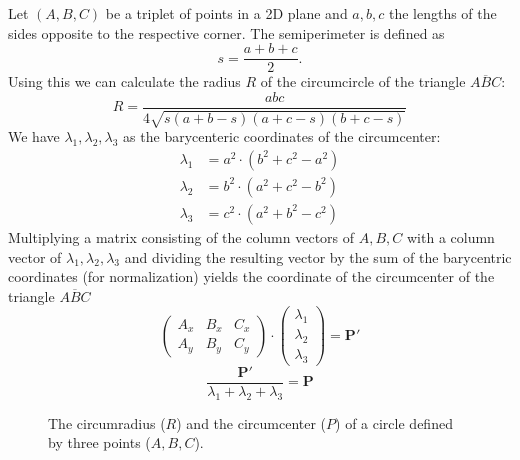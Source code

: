 \documentclass[11pt,twoside]{scrreprt}
\begin{document}
Let $(A,B,C)$ be a triplet of points in a 2D plane and $a,b,c$ the lengths of the sides opposite to the respective corner.
%
The semiperimeter is defined as
%
\begin{equation}
  s = \frac{a+b+c}{2}.
\end{equation}
%
Using this we can calculate the radius $R$ of the circumcircle of the triangle $\overline{ABC}$:
\begin{equation}
  R = \frac{abc}{4\sqrt{s(a+b-s)(a+c-s)(b+c-s)}}
\end{equation}
We have $\lambda_1, \lambda_2, \lambda_3$ as the barycenteric coordinates of the circumcenter:
\begin{align}
  \lambda_1 &= a^2\cdot(b^2+c^2-a^2)\\
  \lambda_2 &= b^2\cdot(a^2+c^2-b^2)\\
  \lambda_3 &= c^2\cdot(a^2+b^2-c^2)
\end{align}
Multiplying a matrix consisting of the column vectors of $A,B,C$ with a column vector of $\lambda_1, \lambda_2, \lambda_3$ and dividing the resulting vector by the sum of the barycentric coordinates (for normalization) yields the coordinate of the circumcenter of the triangle $\overline{ABC}$ 
%
\begin{equation}
  \begin{pmatrix}
    A_x & B_x & C_x \\
    A_y & B_y & C_y
  \end{pmatrix} \cdot \begin{pmatrix}
    \lambda_1\\
    \lambda_2\\
    \lambda_3
  \end{pmatrix} = \boldsymbol{P'}
\end{equation}
%
\begin{equation}
  \frac{\boldsymbol{P'}}{\lambda_1+\lambda_2+\lambda_3} = \boldsymbol{P}
\end{equation}
%
\begin{figure}[tb]
\centering
{}
\caption{The circumradius ($R$) and the circumcenter ($P$) of a circle defined by three points ($A,B,C$).}
\label{fig:circum_fig}
\end{figure}
\end{document}
